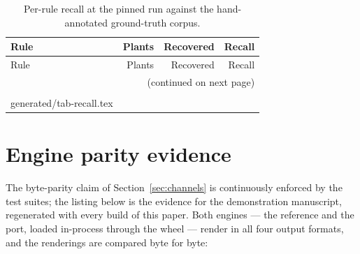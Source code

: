 \documentclass[nojss,article]{jss}
\makeatletter
\newcommand{\rawinput}[1]{\@@input #1 }
\makeatother
\begin{document}
\begin{appendix}
\begin{longtable}{lrrr}
\toprule
Rule & Plants & Recovered & Recall \\
\midrule
\endfirsthead
\toprule
Rule & Plants & Recovered & Recall \\
\midrule
\endhead
\midrule
\multicolumn{4}{r}{(continued on next page)}\\
\endfoot
\bottomrule
\caption{Per-rule recall at the pinned run against the hand-annotated
  ground-truth corpus.}\label{tab:perrule-recall}\\
\endlastfoot
\rawinput{generated/tab-recall.tex}
\end{longtable}

\section{Engine parity evidence}
\label{app:parity}

The byte-parity claim of Section~\ref{sec:channels} is continuously
enforced by the test suites; the listing below is the evidence for
the demonstration manuscript, regenerated with every build of this
paper. Both engines --- the  reference and the
 port, loaded in-process through the 
wheel --- render  in all four output
formats, and the renderings are compared byte for byte:


\end{appendix}
\end{document}
